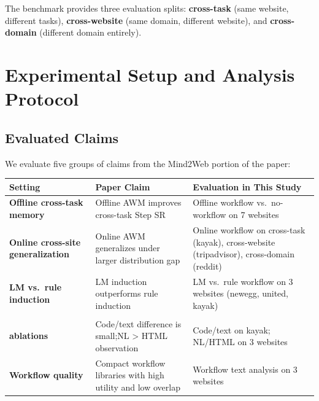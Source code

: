 \documentclass{article}
\begin{document}
The benchmark provides three evaluation splits: \textbf{cross-task}
(same website, different tasks), \textbf{cross-website} (same domain,
different website), and \textbf{cross-domain} (different domain
entirely).

\section{Experimental Setup and Analysis Protocol}\label{reproduction-methodology}

\subsection{Evaluated Claims}\label{claim-structure}

We evaluate five groups of claims from the Mind2Web portion of the
paper:

{\begin{longtable}[]{@{}
  >{\raggedright\arraybackslash}p{}
  >{\raggedright\arraybackslash}p{}
  >{\raggedright\arraybackslash}p{}@{}}
\toprule\noalign{}
\begin{minipage}[b]{\linewidth}\raggedright
Setting
\end{minipage} & \begin{minipage}[b]{\linewidth}\raggedright
Paper Claim
\end{minipage} & \begin{minipage}[b]{\linewidth}\raggedright
Evaluation in This Study
\end{minipage} \\
\midrule\noalign{}
\endhead
\bottomrule\noalign{}
\endlastfoot
\textbf{Offline cross-task memory} & Offline AWM improves cross-task Step SR & Offline workflow
vs.~no-workflow on 7 websites \\
\textbf{Online cross-site generalization} & Online AWM generalizes under larger distribution gap &
Online workflow on cross-task (kayak), cross-website (tripadvisor),
cross-domain (reddit) \\
\textbf{LM vs.~rule induction} & LM induction outperforms rule induction & LM vs.~rule
workflow on 3 websites (newegg, united, kayak) \\
\shortstack[l]{\textbf{Representation}\\\textbf{ablations}} & Code/text difference is small;\newline NL \textgreater{} HTML observation & Code/text on kayak; NL/HTML on 3 websites \\
\textbf{Workflow quality} & Compact workflow libraries with high utility and low
overlap & Workflow text analysis on 3 websites \\
\end{longtable}
}
\end{document}
